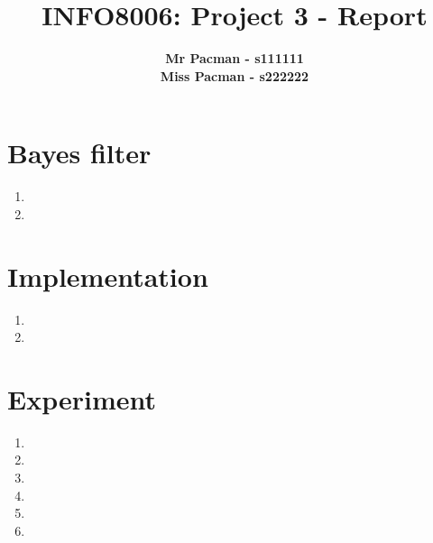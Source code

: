 \documentclass{article}
\begin{document}

\title{\Large{INFO8006: Project 3 - Report}}
\vspace{1cm}
\author{\small{\bf Mr Pacman - s111111} \\ \small{\bf Miss Pacman - s222222}}

\maketitle


\section{Bayes filter}

\begin{enumerate}[label=\alph*.]
    \item
    \item
\end{enumerate}

\section{Implementation}

\begin{enumerate}[label=\alph*.]
    \item
    \item
\end{enumerate}

\section{Experiment}

\begin{enumerate}[label=\alph*.]
    \item
    \item
    \item
    \item
    \item
    \item
\end{enumerate}

\end{document}
